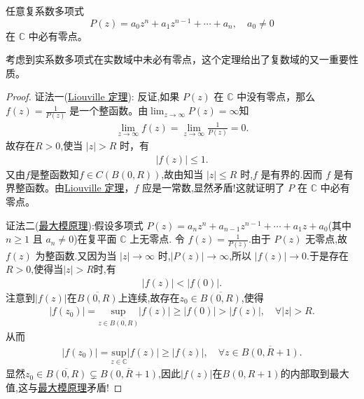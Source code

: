 \documentclass[../../main.tex]{subfiles}%
\begin{document}
\begin{theorem}[代数学基本定理]\label{theorem:代数学基本定理}
任意复系数多项式
\[
P(z) = a_0 z^n + a_1 z^{n - 1} + \cdots + a_n, \quad a_0 \neq 0
\]
在 \( \mathbb{C} \) 中必有零点。
\end{theorem}
\begin{remark}
考虑到实系数多项式在实数域中未必有零点，这个定理给出了复数域的又一重要性质。
\end{remark}
\begin{proof}

{\color{blue}证法一(\hyperref[theorem:Liouville(刘维尔)定理]{Liouville 定理}):}
反证,如果 \( P(z) \) 在 \( \mathbb{C} \) 中没有零点，那么 \( f(z) = \frac{1}{P(z)} \) 是一个整函数。由\( \lim_{z \to \infty} P(z) = \infty \)知
\begin{align*}
\lim_{z\rightarrow \infty} f\left( z \right) =\lim_{z\rightarrow \infty} \frac{1}{P(z)}=0.
\end{align*}
故存在$R>0$,使当 \( |z| > R \) 时，有
\begin{align*}
|f(z)|\leqslant 1.
\end{align*}
又由$f$是整函数知$f\in C(B(0,R))$,故由知当 \( |z| \leqslant R \) 时,\( f \) 是有界的.因而 \( f \) 是有界整函数。由\hyperref[theorem:Liouville(刘维尔)定理]{Liouville 定理}，\( f \) 应是一常数,显然矛盾!这就证明了 \( P \) 在 \( \mathbb{C} \) 中必有零点。

{\color{blue}证法二(\hyperref[theorem:最大模原理-定理4.5.1]{最大模原理}):}假设多项式 \(P(z) = a_n z^n + a_{n-1} z^{n-1} + \cdots + a_1 z + a_0\)(其中 \(n \geqslant 1\) 且 \(a_n \neq 0\))在复平面 \(\mathbb{C}\) 上无零点.
令 \(f(z) = \frac{1}{P(z)}\).由于 \(P(z)\) 无零点,故 \(f(z)\) 为整函数.又因为当 \(|z| \to \infty\) 时,\(|P(z)| \to \infty\),所以 \(|f(z)| \to 0\).于是存在 \(R > 0\),使得当\(|z|>R\)时,有
\begin{align*}
|f(z)|<|f(0)|.
\end{align*}
注意到\(|f(z)|\)在\(\overline{B(0,R)}\)上连续,故存在\(z_0\in \overline{B(0,R)}\),使得
\begin{align*}
|f(z_0)|=\underset{z\in \overline{B(0,R)}}{\mathrm{sup}}|f(z)|\geqslant |f(0)|>|f(z)|, \quad \forall |z|>R.
\end{align*}
从而
\begin{align*}
|f(z_0)|=\underset{z\in \mathbb{C}}{\mathrm{sup}}|f(z)|\geqslant |f(z)|, \quad \forall z\in \overline{B(0,R+1)}.
\end{align*}
显然\(z_0\in \overline{B(0,R)}\subsetneq \overline{B(0,R+1)}\),因此\(|f(z)|\)在\(B(0,R+1)\)的内部取到最大值,这与\hyperref[theorem:最大模原理-定理4.5.1]{最大模原理}矛盾!
\end{proof}
\end{document}
